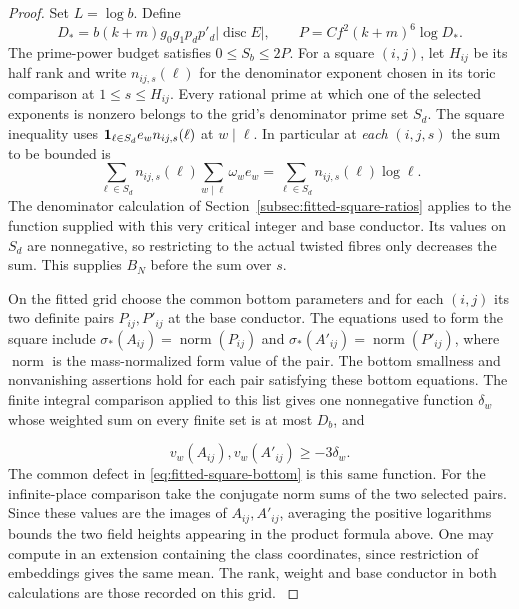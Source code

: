 \begin{proof}
Set \(L=\log b\). Define
\[
 D_*=b(k+m)g_0g_1p_dp'_d|\operatorname{disc}E|,
 \qquad P=C f^2(k+m)^6\log D_*.
\]
The prime-power budget satisfies \(0\le S_b\le2P\).
For a square \((i,j)\), let \(H_{ij}\) be its half rank and
write \(n_{ij,s}(\ell)\) for the denominator exponent chosen in
its toric comparison at \(1\le s\le H_{ij}\). Every rational prime at which
one of the selected exponents is nonzero belongs to the grid's
denominator prime set \(S_d\). The square inequality uses
\({\bf1}_{\ell\in S_d}e_w n_{ij,s}(\ell)\) at \(w\mid\ell\).
In particular at \emph{each} \((i,j,s)\) the sum to be bounded is
\[
 \sum_{\ell\in S_d}n_{ij,s}(\ell)
        \sum_{w\mid\ell}\omega_w e_w
   =\sum_{\ell\in S_d} n_{ij,s}(\ell)\log\ell .
\]
The denominator calculation of Section~\ref{subsec:fitted-square-ratios}
applies to the function supplied with this very critical integer
and base conductor. Its values on \(S_d\) are nonnegative, so
restricting to the actual twisted fibres only decreases the sum.
This supplies \(B_N\) before the sum over \(s\).

On the fitted grid choose the common bottom parameters and for
each \((i,j)\) its two definite pairs \(P_{ij},P'_{ij}\) at the
base conductor. The equations used to form the square include
\(\sigma_*(A_{ij})=\operatorname{norm}(P_{ij})\) and
\(\sigma_*(A'_{ij})=\operatorname{norm}(P'_{ij})\), where
\(\operatorname{norm}\) is the mass-normalized form value of
the pair. The bottom smallness and nonvanishing assertions
hold for each pair satisfying these bottom equations. The
finite integral comparison applied to this list gives one
nonnegative function \(\delta_w\) whose weighted sum on
every finite set is at most \(D_b\), and

\[
  v_w(A_{ij}),v_w(A'_{ij})\ge-3\delta_w.
\]
 The common
defect in \eqref{eq:fitted-square-bottom} is this same function.
For the infinite-place comparison take the conjugate norm sums
of the two selected pairs. Since these values are the images of
\(A_{ij},A'_{ij}\), averaging the positive logarithms bounds
the two field heights appearing in the product formula above.
One may compute in an extension containing the class coordinates, since
restriction of embeddings gives the same mean. The rank,
weight and base conductor in both calculations are those
recorded on this grid.
\label{cor:fitted-row-height-3}


\end{proof}
